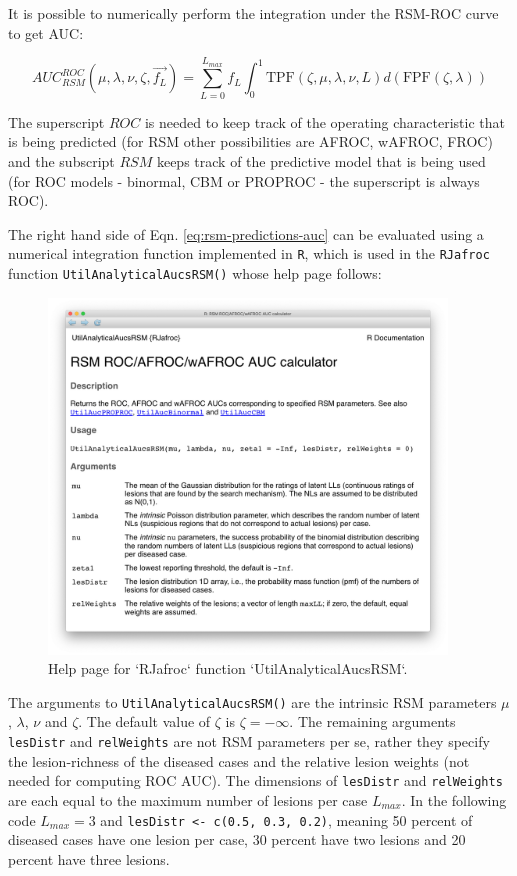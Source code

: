 \documentclass[
]{book}
\begin{document}
It is possible to numerically perform the integration under the RSM-ROC curve to get AUC:

\begin{equation}
AUC_{RSM}^{ROC}\left ( \mu, \lambda, \nu,  \zeta, \overrightarrow{f_L} \right ) = \sum_{L=0}^{L_{max}} f_L \int_{0}^{1} \text{TPF}\left (\zeta,  \mu, \lambda, \nu, L \right ) d\left ( \text{FPF}\left (\zeta, \lambda \right ) \right )
\label{eq:rsm-predictions-auc}
\end{equation}

The superscript \(ROC\) is needed to keep track of the operating characteristic that is being predicted (for RSM other possibilities are AFROC, wAFROC, FROC) and the subscript \(RSM\) keeps track of the predictive model that is being used (for ROC models - binormal, CBM or PROPROC - the superscript is always ROC).

The right hand side of Eqn. \eqref{eq:rsm-predictions-auc} can be evaluated using a numerical integration function implemented in \texttt{R}, which is used in the \texttt{RJafroc} function \texttt{UtilAnalyticalAucsRSM()} whose help page follows:

\begin{figure}

{\centering \includegraphics[width=300pt]{images/rsm-predictions/util-analytical-aucs-rsm} 

}

\caption{Help page for `RJafroc` function `UtilAnalyticalAucsRSM`.}\label{fig:rsm-predictions-help}
\end{figure}

The arguments to \texttt{UtilAnalyticalAucsRSM()} are the intrinsic RSM parameters \(\mu\), \(\lambda\), \(\nu\) and \(\zeta\). The default value of \(\zeta\) is \(\zeta = -\infty\). The remaining arguments \texttt{lesDistr} and \texttt{relWeights} are not RSM parameters per se, rather they specify the lesion-richness of the diseased cases and the relative lesion weights (not needed for computing ROC AUC). The dimensions of \texttt{lesDistr} and \texttt{relWeights} are each equal to the maximum number of lesions per case \(L_{max}\). In the following code \(L_{max} = 3\) and \texttt{lesDistr\ \textless{}-\ c(0.5,\ 0.3,\ 0.2)}, meaning 50 percent of diseased cases have one lesion per case, 30 percent have two lesions and 20 percent have three lesions.
\end{document}
